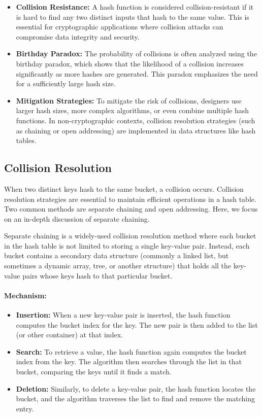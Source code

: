 \begin{itemize}
    \item \textbf{Collision Resistance:} A hash function is considered collision-resistant if it is hard to find any two distinct inputs that hash to the same value. This is essential for cryptographic applications where collision attacks can compromise data integrity and security.
    \item \textbf{Birthday Paradox:} The probability of collisions is often analyzed using the birthday paradox, which shows that the likelihood of a collision increases significantly as more hashes are generated. This paradox emphasizes the need for a sufficiently large hash size.
    \item \textbf{Mitigation Strategies:} To mitigate the risk of collisions, designers use larger hash sizes, more complex algorithms, or even combine multiple hash functions. In non-cryptographic contexts, collision resolution strategies (such as chaining or open addressing) are implemented in data structures like hash tables.
\end{itemize}

\subsection{Collision Resolution}

When two distinct keys hash to the same bucket, a collision occurs. Collision resolution strategies are essential to maintain efficient operations in a hash table. Two common methods are separate chaining and open addressing. Here, we focus on an in-depth discussion of separate chaining.

Separate chaining is a widely-used collision resolution method where each bucket in the hash table is not limited to storing a single key-value pair. Instead, each bucket contains a secondary data structure (commonly a linked list, but sometimes a dynamic array, tree, or another structure) that holds all the key-value pairs whose keys hash to that particular bucket.

\paragraph{Mechanism:}  
\begin{itemize}
    \item \textbf{Insertion:} When a new key-value pair is inserted, the hash function computes the bucket index for the key. The new pair is then added to the list (or other container) at that index.
    \item \textbf{Search:} To retrieve a value, the hash function again computes the bucket index from the key. The algorithm then searches through the list in that bucket, comparing the keys until it finds a match.
    \item \textbf{Deletion:} Similarly, to delete a key-value pair, the hash function locates the bucket, and the algorithm traverses the list to find and remove the matching entry.
\end{itemize}

